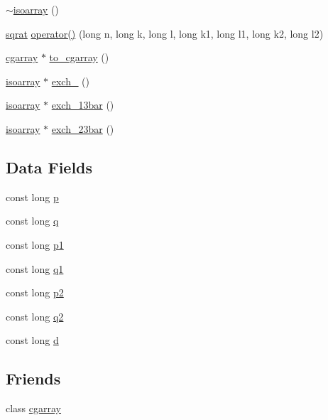 \begin{DoxyCompactItemize}
\item 
\mbox{\hyperlink{classisoarray_ab1ff7ca3e0edb468608b42d2d2aad08b}{$\sim$isoarray}} ()
\item 
\mbox{\hyperlink{classsqrat}{sqrat}} \mbox{\hyperlink{classisoarray_a07114d3b1b8f125d169f10f81884ce16}{operator()}} (long n, long k, long l, long k1, long l1, long k2, long l2)
\item 
\mbox{\hyperlink{classcgarray}{cgarray}} $\ast$ \mbox{\hyperlink{classisoarray_a66ca849c4b34cafeee945037d814a8dc}{to\+\_\+cgarray}} ()
\item 
\mbox{\hyperlink{classisoarray}{isoarray}} $\ast$ \mbox{\hyperlink{classisoarray_ac56742183c8846ff2a5b315d1fc0b90b}{exch\+\_}} ()
\item 
\mbox{\hyperlink{classisoarray}{isoarray}} $\ast$ \mbox{\hyperlink{classisoarray_a0fd60ac09d139d86f9cf8fa18fa5577d}{exch\+\_\+13bar}} ()
\item 
\mbox{\hyperlink{classisoarray}{isoarray}} $\ast$ \mbox{\hyperlink{classisoarray_a9dd30b80f22c1bbc17633283f0056e69}{exch\+\_\+23bar}} ()
\end{DoxyCompactItemize}
\subsection*{Data Fields}
\begin{DoxyCompactItemize}
\item 
const long \mbox{\hyperlink{classisoarray_adeea7560653c9c61f9ec7ca78ec1a43d}{p}}
\item 
const long \mbox{\hyperlink{classisoarray_a6ba8b815c26280122084ee9754cfd868}{q}}
\item 
const long \mbox{\hyperlink{classisoarray_a44a74d2c637cd50b4016fb68f469d674}{p1}}
\item 
const long \mbox{\hyperlink{classisoarray_a49a8c7ad042720ba0f0251f838a81926}{q1}}
\item 
const long \mbox{\hyperlink{classisoarray_a2c7e4538fd56007f89979d0f1d19f4cf}{p2}}
\item 
const long \mbox{\hyperlink{classisoarray_a3d08dedb3a7b238fe7a088f8aa54db0b}{q2}}
\item 
const long \mbox{\hyperlink{classisoarray_af3715f50052bd54b3476e9831fe4d71b}{d}}
\end{DoxyCompactItemize}
\subsection*{Friends}
\begin{DoxyCompactItemize}
\item 
class \mbox{\hyperlink{classisoarray_a27c452d0372903eeb416af9256dacd0f}{cgarray}}
\end{DoxyCompactItemize}



